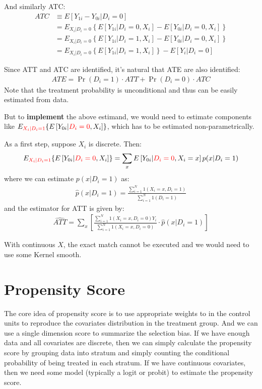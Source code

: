 And similarly ATC:
\begin{align*}
    ATC &\equiv E[Y_{1i}-Y_{0i} | D_i = 0] \\
    &= E_{X_i|D_i=0} \left\{ E\left[Y_{1i}|D_i=0,X_i\right] - E\left[Y_{0i}|D_i=0,X_i\right]  \right\}\\
    &= E_{X_i|D_i=0} \left\{ E\left[Y_{1i}|D_i=1,X_i\right] - E\left[Y_{0i}|D_i=0,X_i\right]  \right\}\\
    &=  E_{X_i|D_i=0} \left\{ E\left[Y_{1i}|D_i=1,X_i\right] \right\} - E[Y_i|D_i=0]
\end{align*}

Since ATT and ATC are identified, it's natural that ATE are also identified:
\begin{align*}
    ATE = \Pr(D_i=1) \cdot ATT + \Pr(D_i=0) \cdot ATC
\end{align*}
Note that the treatment probability is unconditional and thus can be easily estimated from data.

But to \textbf{implement} the above estimand, we would need to estimate components like $E_{{\color{red} X_i|D_i=1}} \{E\left[Y_{0i}|{\color{red} D_i=0},X_i\right] \}$, which has to be estimated non-parametrically.

As a first step, suppose $X_i$ is discrete. 
Then:
\begin{align*}
    E_{{\color{red} X_i|D_i=1}} \{E\left[Y_{0i}|{\color{red} D_i=0},X_i\right] \}
    = \sum_x E\left[Y_{0i}|{\color{red} D_i=0},X_i = x\right] p(x|D_i=1)
\end{align*}
where we can estimate $p(x|D_i=1)$ as:
\begin{align*}
    \hat p(x|D_i=1) = \frac{\sum_{i=1}^{N} {1(X_i=x,D_i=1)}}{\sum_{i=1}^{N} {1(D_i=1)}}
\end{align*}
and the estimator for ATT is given by:
\begin{align*}
    \widehat {ATT} = \sum_{x} \left [
    \frac{\sum_{i=1}^{N} {1(X_i=x,D_i=0)Y_i}} {\sum_{i=1}^{N} {1(X_i=x, D_i=0)}} \cdot \hat p(x|D_i=1)
    \right ]
\end{align*}

With continuous $X$, the exact match cannot be executed and we would need to use some Kernel smooth. 

\section{Propensity Score}
\label{sec:propensity_score}

The core idea of propensity score is to use appropriate weights to in the control units to reproduce the covariates distribution in the treatment group. 
And we can use a single dimension score to summarize the selection bias.
If we have enough data and all covariates are discrete, then we can simply calculate the propensity score by grouping data into stratum and simply counting the conditional probability of being treated in each stratum.
If we have continuous covariates, then we need some model (typically a logit or probit) to estimate the propensity score.

